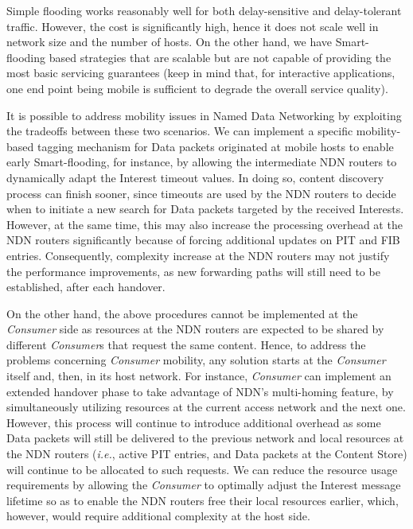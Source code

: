 \documentclass[conference]{IEEEtran}
\begin{document}
Simple flooding works reasonably well for both delay-sensitive and delay-tolerant traffic. However, the cost is significantly high, hence it does not scale well in network size and the number of hosts. On the other hand, we have Smart-flooding based strategies that are scalable but are not capable of providing the most basic servicing guarantees (keep in mind that, for interactive applications, one end point being mobile is sufficient to degrade the overall service quality).

It is possible to address mobility issues in Named Data Networking by exploiting the tradeoffs between these two scenarios. We can implement a specific mobility-based tagging mechanism for Data packets originated at mobile hosts to enable early Smart-flooding, for instance, by allowing the intermediate NDN routers to dynamically adapt the Interest timeout values. In doing so, content discovery process can finish sooner, since timeouts are used by the NDN routers to decide when to initiate a new search for Data packets targeted by the received Interests. However, at the same time, this may also increase the processing overhead at the NDN routers significantly because of forcing additional updates on PIT and FIB entries. Consequently, complexity increase at the NDN routers may not justify the performance improvements, as new forwarding paths will still need to be established, after each handover.

On the other hand, the above procedures cannot be implemented at the \emph{Consumer} side as resources at the NDN routers are expected to be shared by different \emph{Consumer}s that request the same content. Hence, to address the problems concerning \emph{Consumer} mobility, any solution starts at the \emph{Consumer} itself and, then, in its host network. For instance, \emph{Consumer} can implement an extended handover phase to take advantage of NDN's multi-homing feature, by simultaneously utilizing resources at the current access network and the next one. However, this process will continue to introduce additional overhead as some Data packets will still be delivered to the previous network and local resources at the NDN routers (\emph{i.e.}, active PIT entries, and Data packets at the Content Store) will continue to be allocated to such requests. We can reduce the resource usage requirements by allowing the \emph{Consumer} to optimally adjust the Interest message lifetime so as to enable the NDN routers free their local resources earlier, which, however, would require additional complexity at the host side.
\end{document}
